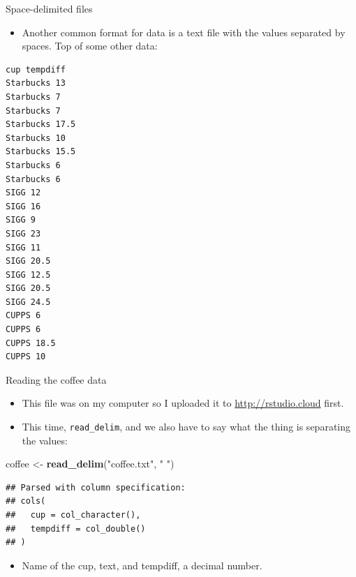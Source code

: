 \documentclass[ignorenonframetext,]{beamer}
\newenvironment{Shaded}{\begin{snugshade}}{\end{snugshade}}
\newcommand{\KeywordTok}[1]{\textcolor[rgb]{0.13,0.29,0.53}{\textbf{#1}}}
\newcommand{\NormalTok}[1]{#1}
\newcommand{\StringTok}[1]{\textcolor[rgb]{0.31,0.60,0.02}{#1}}
\providecommand{\tightlist}{%
  \setlength{\itemsep}{0pt}\setlength{\parskip}{0pt}}
\begin{document}
\begin{frame}[fragile]{Space-delimited files}
\protect\hypertarget{space-delimited-files}{}

\begin{itemize}
\tightlist
\item
  Another common format for data is a text file with the values
  separated by spaces. Top of some other data:
\end{itemize}

\begin{verbatim}
cup tempdiff            
Starbucks 13            
Starbucks 7        
Starbucks 7        
Starbucks 17.5     
Starbucks 10       
Starbucks 15.5     
Starbucks 6        
Starbucks 6        
SIGG 12            
SIGG 16            
SIGG 9             
SIGG 23            
SIGG 11            
SIGG 20.5          
SIGG 12.5      
SIGG 20.5      
SIGG 24.5      
CUPPS 6    
CUPPS 6    
CUPPS 18.5 
CUPPS 10   
\end{verbatim}

\end{frame}

\begin{frame}[fragile]{Reading the coffee data}
\protect\hypertarget{reading-the-coffee-data}{}

\begin{itemize}
\tightlist
\item
  This file was on my computer so I uploaded it to
  \url{http://rstudio.cloud} first.
\item
  This time, \texttt{read\_delim}, and we also have to say what the
  thing is separating the values:
\end{itemize}

\begin{Shaded}
\begin{Highlighting}[]
\NormalTok{coffee <-}\StringTok{ }\KeywordTok{read_delim}\NormalTok{(}\StringTok{"coffee.txt"}\NormalTok{, }\StringTok{" "}\NormalTok{)}
\end{Highlighting}
\end{Shaded}

\begin{verbatim}
## Parsed with column specification:
## cols(
##   cup = col_character(),
##   tempdiff = col_double()
## )
\end{verbatim}

\begin{itemize}
\tightlist
\item
  Name of the cup, text, and tempdiff, a decimal number.
\end{itemize}

\end{frame}
\end{document}
